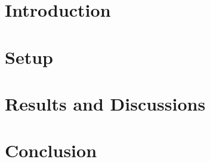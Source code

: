 \documentclass{icl_report}
\begin{document}
\startfrontmatter
{}


\tableofcontents
\newpage
\listoffigures
\newpage
\listoftables
\newpage



\begin{nomenclaturetable}
\end{nomenclaturetable}




\startmainmatter



\section{Introduction}
\newpage
\section{Setup}
\newpage
\section{Results and Discussions}
\newpage
\section{Conclusion}
\newpage




\startbackmatter





\newpage


\createappendix
\end{document}
